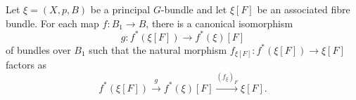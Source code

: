 Let $\xi = (X, p, B)$ be a principal $G$-bundle and let $\xi[F]$ be an associated fibre bundle. For each map $f: B_1 \to B$, there is a canonical isomorphism
$$g: f^*(\xi[F]) \to f^*(\xi)[F]$$
of bundles over $B_1$ such that the natural morphism $f_{\xi[F]}: f^*(\xi[F]) \to \xi[F]$ factors as
$$f^*(\xi[F]) \xrightarrow{g} f^*(\xi)[F] \xrightarrow{(f_{\xi})_F} \xi[F].$$
